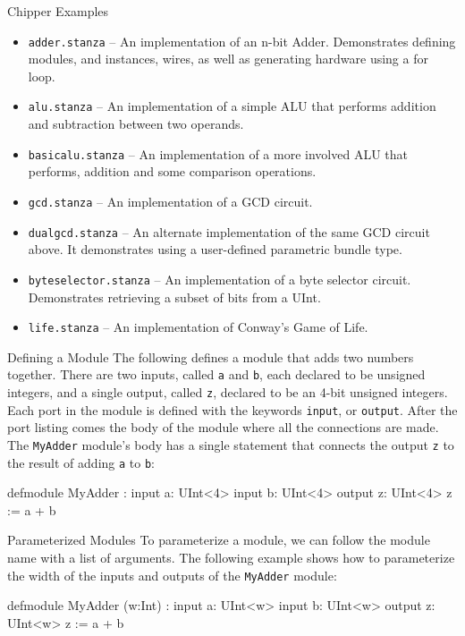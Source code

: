 \documentclass[xcolor=pdflatex,dvipsnames,table]{beamer}
\begin{document}
\begin{frame}[fragile]{Chipper Examples}
\begin{itemize}
\item \verb+adder.stanza+ -- An implementation of an n-bit Adder. Demonstrates defining modules, and instances, wires, as well as generating hardware using a for loop.
\item \verb+alu.stanza+ -- An implementation of a simple ALU that performs addition and subtraction between two operands.
\item \verb+basicalu.stanza+ --  An implementation of a more involved ALU that performs, addition and some comparison operations.
\item \verb+gcd.stanza+ -- An implementation of a GCD circuit.
\item \verb+dualgcd.stanza+ -- An alternate implementation of the same GCD circuit above. It demonstrates using a user-defined parametric bundle type.
\item \verb+byteselector.stanza+ -- An implementation of a byte selector circuit. Demonstrates retrieving a subset of bits from a UInt.
\item \verb+life.stanza+ -- An implementation of Conway's Game of Life. 
\end{itemize}
\end{frame}

\begin{frame}[fragile]{Defining a Module}
The following defines a module that adds two numbers together. There are two inputs, called \verb+a+ and \verb+b+, each declared to be unsigned integers, and a single output, called \verb+z+, declared to be an 4-bit unsigned integers. Each port in the module is defined with the keywords \verb+input+, or \verb+output+. After the port listing comes the body of the module where all the connections are made. The \verb+MyAdder+ module's body has a single statement that connects the output \verb+z+ to the result of adding \verb+a+ to \verb+b+:

\begin{stanza}
defmodule MyAdder :
   input a: UInt<4>
   input b: UInt<4>
   output z: UInt<4>
   z := a + b
\end{stanza}
\end{frame}

\begin{frame}[fragile]{Parameterized Modules}
To parameterize a module, we can follow the module name with a list of arguments. The following example shows how to parameterize the width of the inputs and outputs of the \verb+MyAdder+ module:

\begin{stanza}
defmodule MyAdder (w:Int) :
   input a: UInt<w>
   input b: UInt<w>
   output z: UInt<w>
   z := a + b
\end{stanza}
\end{frame}
\end{document}
